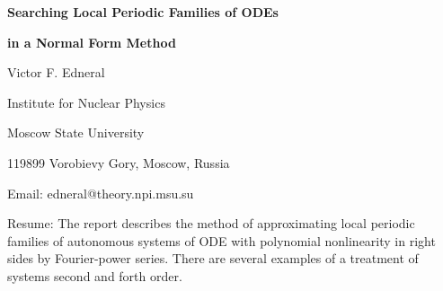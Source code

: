 

\centerline{\bf Searching Local Periodic Families of ODEs}
\centerline{\bf in a Normal Form Method}

\vskip 0.3cm

\centerline{Victor F. Edneral}
\centerline{Institute for Nuclear Physics}
\centerline{Moscow State University}
\centerline{119899 Vorobievy Gory, Moscow, Russia}
\centerline{Email: edneral@theory.npi.msu.su}

\vskip 0.3cm

Resume: The  report  describes the  method  of  approximating local
periodic  families of autonomous systems of ODE  with polynomial
nonlinearity  in right sides by Fourier-power series. There  are
several examples of a treatment of systems second and forth order.


